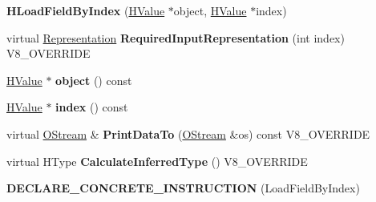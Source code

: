 \begin{DoxyCompactItemize}
\item 
\hypertarget{classv8_1_1internal_1_1_v8___f_i_n_a_l_a5ecc4522d051cc02e73ab1c2ea932e17}{}{\bfseries H\+Load\+Field\+By\+Index} (\hyperlink{classv8_1_1internal_1_1_h_value}{H\+Value} $\ast$object, \hyperlink{classv8_1_1internal_1_1_h_value}{H\+Value} $\ast$index)\label{classv8_1_1internal_1_1_v8___f_i_n_a_l_a5ecc4522d051cc02e73ab1c2ea932e17}

\item 
\hypertarget{classv8_1_1internal_1_1_v8___f_i_n_a_l_a6c6d1f37f40b113d8f4062f1ffff7215}{}virtual \hyperlink{classv8_1_1internal_1_1_representation}{Representation} {\bfseries Required\+Input\+Representation} (int index) V8\+\_\+\+O\+V\+E\+R\+R\+I\+D\+E\label{classv8_1_1internal_1_1_v8___f_i_n_a_l_a6c6d1f37f40b113d8f4062f1ffff7215}

\item 
\hypertarget{classv8_1_1internal_1_1_v8___f_i_n_a_l_a5cf72ed4b954f3413a0aa63069a75283}{}\hyperlink{classv8_1_1internal_1_1_h_value}{H\+Value} $\ast$ {\bfseries object} () const \label{classv8_1_1internal_1_1_v8___f_i_n_a_l_a5cf72ed4b954f3413a0aa63069a75283}

\item 
\hypertarget{classv8_1_1internal_1_1_v8___f_i_n_a_l_ae35cd4b0e5fed0e15fcbbaaad81399c5}{}\hyperlink{classv8_1_1internal_1_1_h_value}{H\+Value} $\ast$ {\bfseries index} () const \label{classv8_1_1internal_1_1_v8___f_i_n_a_l_ae35cd4b0e5fed0e15fcbbaaad81399c5}

\item 
\hypertarget{classv8_1_1internal_1_1_v8___f_i_n_a_l_ac450dad970b14246be761ccf5004924b}{}virtual \hyperlink{classv8_1_1internal_1_1_o_stream}{O\+Stream} \& {\bfseries Print\+Data\+To} (\hyperlink{classv8_1_1internal_1_1_o_stream}{O\+Stream} \&os) const V8\+\_\+\+O\+V\+E\+R\+R\+I\+D\+E\label{classv8_1_1internal_1_1_v8___f_i_n_a_l_ac450dad970b14246be761ccf5004924b}

\item 
\hypertarget{classv8_1_1internal_1_1_v8___f_i_n_a_l_a7a6782b8660ab150601db2ff28262edd}{}virtual H\+Type {\bfseries Calculate\+Inferred\+Type} () V8\+\_\+\+O\+V\+E\+R\+R\+I\+D\+E\label{classv8_1_1internal_1_1_v8___f_i_n_a_l_a7a6782b8660ab150601db2ff28262edd}

\item 
\hypertarget{classv8_1_1internal_1_1_v8___f_i_n_a_l_a4a65c22f3fdfb71caf3c3f8d511543c6}{}{\bfseries D\+E\+C\+L\+A\+R\+E\+\_\+\+C\+O\+N\+C\+R\+E\+T\+E\+\_\+\+I\+N\+S\+T\+R\+U\+C\+T\+I\+O\+N} (Load\+Field\+By\+Index)\label{classv8_1_1internal_1_1_v8___f_i_n_a_l_a4a65c22f3fdfb71caf3c3f8d511543c6}


\end{DoxyCompactItemize}
